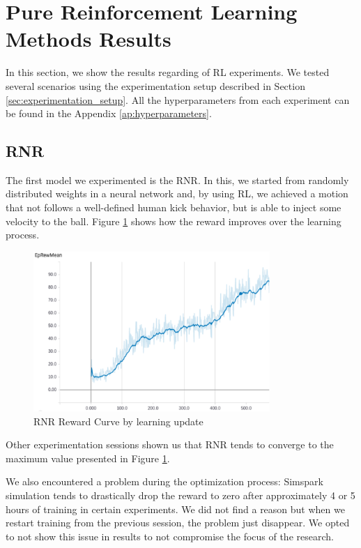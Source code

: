 \section{Pure Reinforcement Learning Methods Results}

In this section, we show the results regarding of RL experiments. We tested several scenarios using the experimentation setup described in Section \ref{sec:experimentation_setup}. All the hyperparameters from each experiment can be found in the Appendix \ref{ap:hyperparameters}.

\subsection{RNR}

The first model we experimented is the RNR. In this, we started from randomly distributed weights in a neural network and, by using RL, we achieved a motion that not follows a well-defined human kick behavior, but is able to inject some velocity to the ball. Figure \ref{fig:rnrreward} shows how the reward improves over the learning process.

\begin{figure}[!htbp]
	\centering
	\includegraphics[width=0.8\textwidth]{Cap6/rnrreward.eps}
	\caption{RNR Reward Curve by learning update}
	\label{fig:rnrreward}
\end{figure}

Other experimentation sessions shown us that RNR tends to converge to the maximum value presented in Figure \ref{fig:rnrreward}.

We also encountered a problem during the optimization process: Simspark simulation tends to drastically drop the reward to zero after approximately 4 or 5 hours of training in certain experiments. We did not find a reason but when we restart training from the previous session, the problem just disappear. We opted to not show this issue in results to not compromise the focus of the research.

